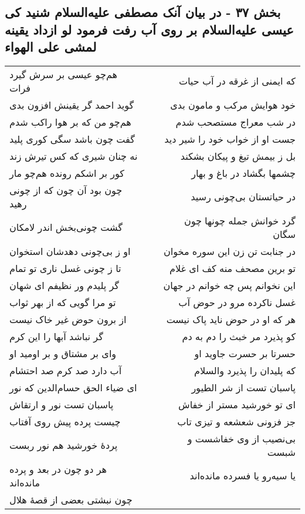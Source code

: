 \begin{center}
\section*{بخش ۳۷ - در بیان آنک مصطفی علیه‌السلام شنید کی عیسی علیه‌السلام بر روی آب رفت  فرمود لو ازداد یقینه لمشی علی الهواء}
\label{sec:sh037}
\begin{longtable}{l p{0.5cm} r}
هم‌چو عیسی بر سرش گیرد فرات
&&
که ایمنی از غرقه در آب حیات
\\
گوید احمد گر یقینش افزون بدی
&&
خود هوایش مرکب و مامون بدی
\\
هم‌چو من که بر هوا راکب شدم
&&
در شب معراج مستصحب شدم
\\
گفت چون باشد سگی کوری پلید
&&
جست او از خواب خود را شیر دید
\\
نه چنان شیری که کس تیرش زند
&&
بل ز بیمش تیغ و پیکان بشکند
\\
کور بر اشکم رونده هم‌چو مار
&&
چشمها بگشاد در باغ و بهار
\\
چون بود آن چون که از چونی رهید
&&
در حیاتستان بی‌چونی رسید
\\
گشت چونی‌بخش اندر لامکان
&&
گرد خوانش جمله چونها چون سگان
\\
او ز بی‌چونی دهدشان استخوان
&&
در جنابت تن زن این سوره مخوان
\\
تا ز چونی غسل ناری تو تمام
&&
تو برین مصحف منه کف ای غلام
\\
گر پلیدم ور نظیفم ای شهان
&&
این نخوانم پس چه خوانم در جهان
\\
تو مرا گویی که از بهر ثواب
&&
غسل ناکرده مرو در حوض آب
\\
از برون حوض غیر خاک نیست
&&
هر که او در حوض ناید پاک نیست
\\
گر نباشد آبها را این کرم
&&
کو پذیرد مر خبث را دم به دم
\\
وای بر مشتاق و بر اومید او
&&
حسرتا بر حسرت جاوید او
\\
آب دارد صد کرم صد احتشام
&&
که پلیدان را پذیرد والسلام
\\
ای ضیاء الحق حسام‌الدین که نور
&&
پاسبان تست از شر الطیور
\\
پاسبان تست نور و ارتقاش
&&
ای تو خورشید مستر از خفاش
\\
چیست پرده پیش روی آفتاب
&&
جز فزونی شعشعه و تیزی تاب
\\
پردهٔ خورشید هم نور ربست
&&
بی‌نصیب از وی خفاشست و شبست
\\
هر دو چون در بعد و پرده مانده‌اند
&&
یا سیه‌رو یا فسرده مانده‌اند
\\
چون نبشتی بعضی از قصهٔ هلال

\end{longtable}
\end{center}

